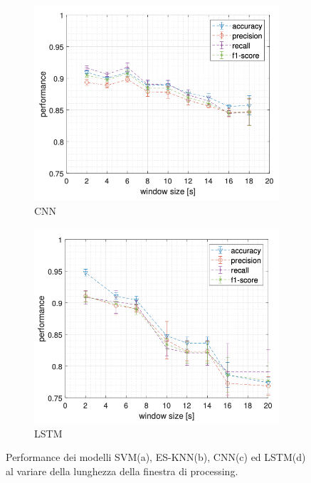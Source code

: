 \begin{figure}[!htb]
\begin{subfigure}{.45\textwidth}
        \includegraphics[width=\textwidth]{figure/cnn_window.png}
        \caption{CNN}
        \label{fig:window:cnn}
    \end{subfigure}
    \begin{subfigure}{.45\textwidth}
        \includegraphics[width=\textwidth]{figure/lstm_window.png}
        \caption{LSTM}
        \label{fig:window:lstm}
    \end{subfigure}
    \caption{Performance dei modelli SVM(a), ES-KNN(b), CNN(c) ed LSTM(d) al variare della lunghezza della finestra di processing.}
    \label{fig:window}
\end{figure}

